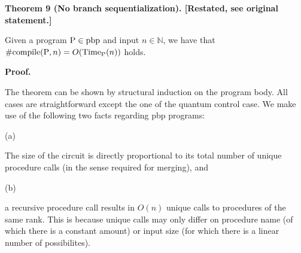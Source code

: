  
 
 
\par\medskip\noindent\textbf{Theorem 9 (No branch sequentialization). [Restated, see original statement.]}\par
 
 
Given a program $\mathrm{P}\in\textnormal{{pbp}}{}$ and input $n\in\mathbb{N}$, we have that $\#\textnormal{{{compile}}{}}(\mathrm{P},n)=O(\textnormal{Time}_{\mathrm{P}}(n))$ holds.\par
 
 
 
 
 
 
\par\medskip\noindent\textbf{Proof.}\par
 
 
The theorem can be shown by structural induction on the program body. All cases are straightforward except the one of the quantum control case. We make use of the following two facts regarding pbp programs:\par
  
\par\noindent  (a) 
 
The size of the circuit is directly proportional to its total number of unique procedure calls (in the sense required for merging), and\par
 
 
 
\par\noindent  (b) 
 
a recursive procedure call results in $O(n)$ unique calls to procedures of the same rank. This is because unique calls may only differ on procedure name (of which there is a constant amount) or input size (for which there is a linear number of possibilites).\par
 
 
  
 
